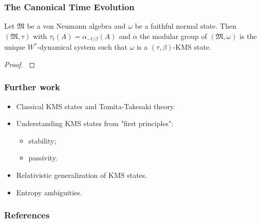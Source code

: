 \documentclass{beamer}
\begin{document}
\begin{frame}
	\frametitle{The Canonical Time Evolution}
	\begin{theorem}[$\bigstar\bigstar\bigstar$]
		Let $\mathfrak{M}$ be a von Neumann algebra and $\omega$ be a faithful normal state. Then $(\mathfrak{M},\tau)$ with $\tau_t(A) = \alpha_{-t/\beta}(A)$ and $\alpha$ the modular group of $(\mathfrak{M},\omega)$ is the unique $W^*$-dynamical system such that $\omega$ is a $(\tau,\beta)$-KMS state.
	\end{theorem}
	\begin{proof}
		\cite{Duvenhage1999}
	\end{proof}
\end{frame}

\begin{frame}
	\frametitle{Further work}
	\begin{itemize}
		\item Classical KMS states and Tomita-Takesaki theory.
		\item Understanding KMS states from "first principles":
		\begin{itemize}
			\item stability;
			\item passivity.
		\end{itemize}
		\item Relativistic generalization of KMS states.
		\item Entropy ambiguities. 
	\end{itemize}
\end{frame}

\begin{frame}[allowframebreaks]
	\frametitle{References}
	
	
\end{frame}
\end{document}
